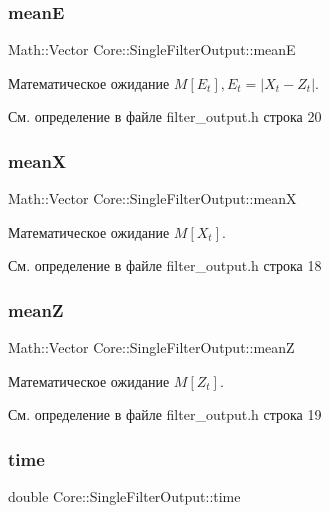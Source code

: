 \subsubsection{\texorpdfstring{meanE}{meanE}}
{\footnotesize\ttfamily Math\+::\+Vector Core\+::\+Single\+Filter\+Output\+::meanE}

Математическое ожидание $M[E_t], E_t = |X_t - Z_t|$. 

См. определение в файле filter\+\_\+output.\+h строка 20

\hypertarget{struct_core_1_1_single_filter_output_aa06ff31e25433b19e09b67b290a187ca}{}\label{struct_core_1_1_single_filter_output_aa06ff31e25433b19e09b67b290a187ca} 
\subsubsection{\texorpdfstring{meanX}{meanX}}
{\footnotesize\ttfamily Math\+::\+Vector Core\+::\+Single\+Filter\+Output\+::meanX}

Математическое ожидание $M[X_t]$. 

См. определение в файле filter\+\_\+output.\+h строка 18

\hypertarget{struct_core_1_1_single_filter_output_aa2350a5b96ca5ef7cdb056e091702b5d}{}\label{struct_core_1_1_single_filter_output_aa2350a5b96ca5ef7cdb056e091702b5d} 
\subsubsection{\texorpdfstring{meanZ}{meanZ}}
{\footnotesize\ttfamily Math\+::\+Vector Core\+::\+Single\+Filter\+Output\+::meanZ}

Математическое ожидание $M[Z_t]$. 

См. определение в файле filter\+\_\+output.\+h строка 19

\hypertarget{struct_core_1_1_single_filter_output_a4d2078c50b021df0d91e862d55619637}{}\label{struct_core_1_1_single_filter_output_a4d2078c50b021df0d91e862d55619637} 
\subsubsection{\texorpdfstring{time}{time}}
{\footnotesize\ttfamily double Core\+::\+Single\+Filter\+Output\+::time}

